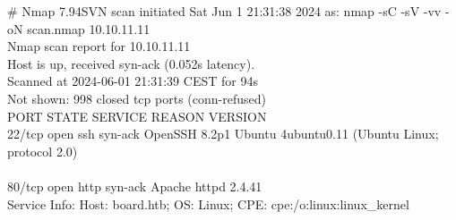 # Nmap 7.94SVN scan initiated Sat Jun  1 21:31:38 2024 as: nmap -sC -sV -vv -oN scan.nmap 10.10.11.11 \\
Nmap scan report for 10.10.11.11 \\
Host is up, received syn-ack (0.052s latency). \\
Scanned at 2024-06-01 21:31:39 CEST for 94s \\
Not shown: 998 closed tcp ports (conn-refused) \\
PORT   STATE SERVICE REASON  VERSION \\
22/tcp open  ssh     syn-ack OpenSSH 8.2p1 Ubuntu 4ubuntu0.11 (Ubuntu Linux; protocol 2.0) \\
 \\
80/tcp open  http    syn-ack Apache httpd 2.4.41 \\
Service Info: Host: board.htb; OS: Linux; CPE: cpe:/o:linux:linux_kernel \\
